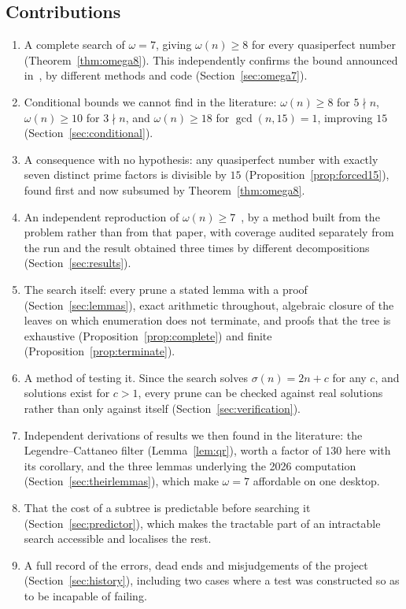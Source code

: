 \documentclass[11pt]{amsart}
\theoremstyle{remark}
\begin{document}
\subsection*{Contributions}
\begin{enumerate}
\item A complete search of $\omega = 7$, giving $\omega(n) \ge 8$ for every
  quasiperfect number (Theorem~\ref{thm:omega8}). This independently confirms the
  bound announced in~\cite{tty}, by different methods and code
  (Section~\ref{sec:omega7}).
\item Conditional bounds we cannot find in the literature:
  $\omega(n) \ge 8$ for $5 \nmid n$, $\omega(n) \ge 10$ for $3 \nmid n$, and
  $\omega(n) \ge 18$ for $\gcd(n,15) = 1$, improving $15$~\cite{prasad}
  (Section~\ref{sec:conditional}).
\item A consequence with no hypothesis: any quasiperfect number with exactly
  seven distinct prime factors is divisible by $15$
  (Proposition~\ref{prop:forced15}), found first and now subsumed by
  Theorem~\ref{thm:omega8}.
\item An independent reproduction of $\omega(n) \ge 7$~\cite{hagiscohen}, by a
  method built from the problem rather than from that paper, with coverage audited
  separately from the run and the result obtained three times by different
  decompositions (Section~\ref{sec:results}).
\item The search itself: every prune a stated lemma with a proof
  (Section~\ref{sec:lemmas}), exact arithmetic throughout, algebraic closure of
  the leaves on which enumeration does not terminate, and proofs that the tree is
  exhaustive (Proposition~\ref{prop:complete}) and finite
  (Proposition~\ref{prop:terminate}).
\item A method of testing it. Since the search solves $\sigma(n) = 2n + c$ for any
  $c$, and solutions exist for $c > 1$, every prune can be checked against real
  solutions rather than only against itself (Section~\ref{sec:verification}).
\item Independent derivations of results we then found in the literature: the
  Legendre--Cattaneo filter (Lemma~\ref{lem:qr}), worth a factor of $130$ here
  with its corollary, and
  the three lemmas underlying the 2026 computation
  (Section~\ref{sec:theirlemmas}), which make $\omega = 7$ affordable on one
  desktop.
\item That the cost of a subtree is predictable before searching it
  (Section~\ref{sec:predictor}), which makes the tractable part of an intractable
  search accessible and localises the rest.
\item A full record of the errors, dead ends and misjudgements of the project
  (Section~\ref{sec:history}), including two cases where a test was constructed so
  as to be incapable of failing.
\end{enumerate}
\end{document}
